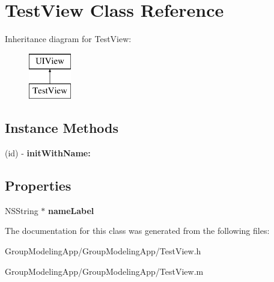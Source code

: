 \hypertarget{interface_test_view}{\section{Test\-View Class Reference}
\label{interface_test_view}
}
Inheritance diagram for Test\-View\-:\begin{figure}[H]
\begin{center}
\leavevmode
\includegraphics[height=2.000000cm]{interface_test_view}
\end{center}
\end{figure}
\subsection*{Instance Methods}
\begin{DoxyCompactItemize}
\item 
\hypertarget{interface_test_view_a7c33a6a67234196892281f15213fef04}{(id) -\/ {\bfseries init\-With\-Name\-:}}\label{interface_test_view_a7c33a6a67234196892281f15213fef04}

\end{DoxyCompactItemize}
\subsection*{Properties}
\begin{DoxyCompactItemize}
\item 
\hypertarget{interface_test_view_ab534dd4f883a1e4729ff5e507873fd51}{N\-S\-String $\ast$ {\bfseries name\-Label}}\label{interface_test_view_ab534dd4f883a1e4729ff5e507873fd51}

\end{DoxyCompactItemize}


The documentation for this class was generated from the following files\-:\begin{DoxyCompactItemize}
\item 
Group\-Modeling\-App/\-Group\-Modeling\-App/Test\-View.\-h\item 
Group\-Modeling\-App/\-Group\-Modeling\-App/Test\-View.\-m\end{DoxyCompactItemize}
